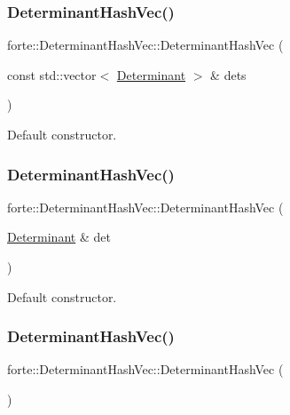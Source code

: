 \subsubsection{\texorpdfstring{Determinant\+Hash\+Vec()}{DeterminantHashVec()}\hspace{0.1cm}{\footnotesize\ttfamily [2/6]}}
{\footnotesize\ttfamily forte\+::\+Determinant\+Hash\+Vec\+::\+Determinant\+Hash\+Vec (\begin{DoxyParamCaption}\item[{const std\+::vector$<$ \mbox{\hyperlink{namespaceforte_a2076c63fd7b8732004d9e1442ce527c1}{Determinant}} $>$ \&}]{dets }\end{DoxyParamCaption})}



Default constructor. 

\mbox{\label{classforte_1_1_determinant_hash_vec_a2ab88d1ebf6df4232f3a3d89470c2cab}} 
\subsubsection{\texorpdfstring{Determinant\+Hash\+Vec()}{DeterminantHashVec()}\hspace{0.1cm}{\footnotesize\ttfamily [3/6]}}
{\footnotesize\ttfamily forte\+::\+Determinant\+Hash\+Vec\+::\+Determinant\+Hash\+Vec (\begin{DoxyParamCaption}\item[{\mbox{\hyperlink{namespaceforte_a2076c63fd7b8732004d9e1442ce527c1}{Determinant}} \&}]{det }\end{DoxyParamCaption})}



Default constructor. 

\mbox{\label{classforte_1_1_determinant_hash_vec_ac5f95a20bc269024fc948691b0326fc4}} 
\subsubsection{\texorpdfstring{Determinant\+Hash\+Vec()}{DeterminantHashVec()}\hspace{0.1cm}{\footnotesize\ttfamily [4/6]}}
{\footnotesize\ttfamily forte\+::\+Determinant\+Hash\+Vec\+::\+Determinant\+Hash\+Vec (\begin{DoxyParamCaption}{ }\end{DoxyParamCaption})}



